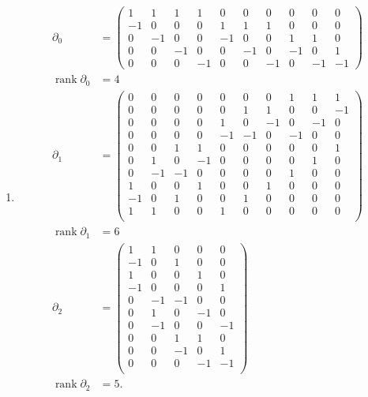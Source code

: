 \documentclass[12 pt, letterpaper]{hmcpset}
\begin{document}
\begin{solution}
\begin{enumerate}
		\item
			\[
				\boxed{
					\begin{split}
						\partial_{0} & = \begin{pmatrix}
1 &  1 &  1 &  1 &  0 &  0 &  0 &  0 & 0 &  0 \\
-1 &  0 &  0 &  0 &  1 &  1 &  1 &  0 & 0 &  0 \\
 0 & -1 &  0 &  0 & -1 &  0 &  0 &  1 & 1 &  0 \\
 0 &  0 & -1 &  0 &  0 & -1 &  0 & -1 & 0 &  1 \\
 0 &  0 &  0 & -1 &  0 &  0 & -1 &  0 & -1 & -1 
\end{pmatrix} \\
						\operatorname{rank} \partial_{0} & = 4 \\
						\partial_{1} & = \begin{pmatrix}
 0 &  0 &  0 &  0 &  0 &  0 &  0 &  1 &  1 &  1 \\
 0 &  0 &  0 &  0 &  0 &  1 &  1 &  0 &  0 & -1 \\
 0 &  0 &  0 &  0 &  1 &  0 & -1 &  0 & -1 &  0 \\
 0 &  0 &  0 &  0 & -1 & -1 &  0 & -1 &  0 &  0 \\
 0 &  0 &  1 &  1 &  0 &  0 &  0 &  0 &  0 &  1 \\
 0 &  1 &  0 & -1 &  0 &  0 &  0 &  0 &  1 &  0 \\
 0 & -1 & -1 &  0 &  0 &  0 &  0 &  1 &  0 &  0 \\
 1 &  0 &  0 &  1 &  0 &  0 &  1 &  0 &  0 &  0 \\
-1 &  0 &  1 &  0 &  0 &  1 &  0 &  0 &  0 &  0 \\
 1 &  1 &  0 &  0 &  1 &  0 &  0 &  0 &  0 &  0 \\
\end{pmatrix} \\
						\operatorname{rank} \partial_{1} & = 6 \\
						\partial_{2} & = \begin{pmatrix}
1 &  1 &  0 &  0 &  0 \\
-1 &  0 &  1 &  0 &  0 \\
 1 &  0 &  0 &  1 &  0 \\
-1 &  0 &  0 &  0 &  1 \\
 0 & -1 & -1 &  0 &  0 \\
 0 &  1 &  0 & -1 &  0 \\
 0 & -1 &  0 &  0 & -1 \\
 0 &  0 &  1 &  1 &  0 \\
 0 &  0 & -1 & 0 &  1 \\
 0 &  0 &  0 &  -1 & -1 \\
\end{pmatrix} \\
						\operatorname{rank} \partial_{2} & = 5.
					\end{split}
				}
			\]


\end{enumerate}
\end{solution}
\end{document}
